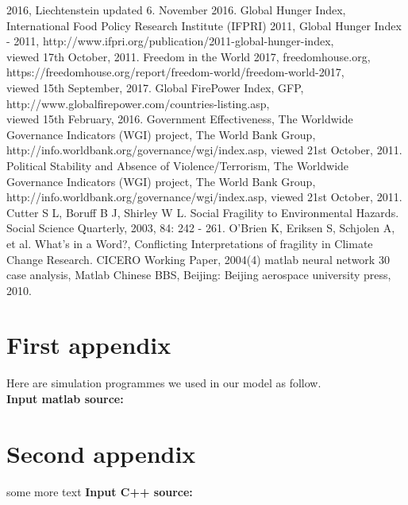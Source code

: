 \documentclass{mcmthesis}
\begin{document}
\begin{thebibliography}{99}
2016, Liechtenstein updated 6. November 2016.
 Global Hunger Index, International Food Policy Research Institute 
(IFPRI) 2011, Global Hunger Index - 2011,
http://www.ifpri.org/publication/2011-global-hunger-index, \\ 
viewed 17th October, 2011.
 Freedom in the World 2017, freedomhouse.org,\\ 
https://freedomhouse.org/report/freedom-world/freedom-world-2017, \\ 
viewed 15th September, 2017.
 Global FirePower Index, GFP,
http://www.globalfirepower.com/countries-listing.asp, \\ 
viewed 15th February, 2016.
 Government Effectiveness, The Worldwide Governance 
Indicators (WGI) project, The World Bank Group, 
http://info.worldbank.org/governance/wgi/index.asp, viewed 21st October, 2011.
 Political Stability and Absence of Violence/Terrorism, 
The Worldwide Governance Indicators (WGI) project, The World Bank Group, \\
http://info.worldbank.org/governance/wgi/index.asp, viewed 21st October, 2011.
 Cutter S L, Boruff B J, Shirley W L. Social 
Fragility to Environmental Hazards. Social Science 
Quarterly, 2003, 84: 242 - 261.
 O’Brien K, Eriksen S, Schjolen A, et al. What’s in a Word?, 
Conflicting Interpretations of fragility in Climate Change Research. CICERO Working Paper, 2004(4)
 matlab neural network 30 case analysis, Matlab Chinese BBS, Beijing: Beijing aerospace university press, 2010.
\end{thebibliography}

\begin{appendices}

\section{First appendix}

\lipsum[13]

Here are simulation programmes we used in our model as follow.\\

\textbf{\textcolor[rgb]{0.98,0.00,0.00}{Input matlab source:}}


\section{Second appendix}

some more text \textcolor[rgb]{0.98,0.00,0.00}{\textbf{Input C++ source:}}


\end{appendices}
\end{document}
